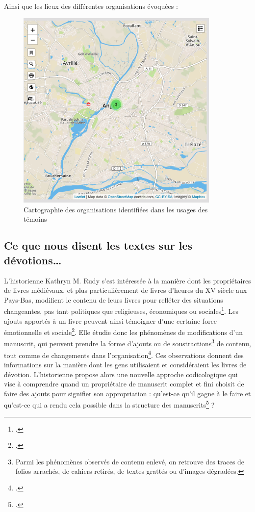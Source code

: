 \documentclass[a4paper,12pt,twoside]{book}
\begin{document}
Ainsi que les lieux des différentes organisations évoquées :
    \begin{figure}[!h]
    \centering
    \includegraphics[width=10cm]{img/DataViz/Lieu_Organisation.png}
    \caption{Cartographie des organisations identifiées dans les usages des témoins}
    \end{figure}
    \clearpage

	
	\subsection{Ce que nous disent les textes sur les dévotions…}
	

L'historienne Kathryn M. Rudy s'est intéressée à la manière dont les propriétaires de livres médiévaux, et plus particulièrement de livres d'heures du \textsc{XV} siècle aux Pays-Bas, modifient le contenu de leurs livres pour refléter des situations changeantes, pas tant politiques que religieuses, économiques ou sociales\footcite[p. 1-2]{Piety_in_Pieces}. Les ajouts apportés à un livre peuvent ainsi témoigner d'une certaine force émotionnelle et sociale\footcite[p. 2]{Piety_in_Pieces}. Elle étudie donc les phénomènes de modifications d'un manuscrit, qui peuvent prendre la forme d'ajouts ou de soustractions\footnote{Parmi les phénomènes observés de contenu enlevé, on retrouve des traces de folios arrachés, de cahiers retirés, de textes grattés ou d'images dégradées.} de contenu, tout comme de changements dans l'organisation\footcite[p. 3]{Piety_in_Pieces}. Ces observations donnent des informations sur la manière dont les gens utilisaient et considéraient les livres de dévotion. L'historienne propose alors une nouvelle approche codicologique qui vise à comprendre quand un propriétaire de manuscrit complet et fini choisit de faire des ajouts pour signifier son appropriation : qu'est-ce qu'il gagne à le faire et qu'est-ce qui a rendu cela possible dans la structure des manuscrits\footcite[p. 5]{Piety_in_Pieces} ?
\end{document}

